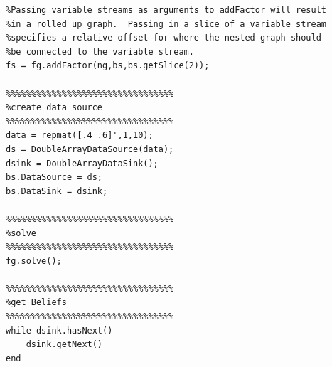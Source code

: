 \begin{lstlisting}
%Passing variable streams as arguments to addFactor will result 
%in a rolled up graph.  Passing in a slice of a variable stream 
%specifies a relative offset for where the nested graph should 
%be connected to the variable stream.                       
fs = fg.addFactor(ng,bs,bs.getSlice(2));

%%%%%%%%%%%%%%%%%%%%%%%%%%%%%%%%%                                                                                             
%create data source                                                                                                           
%%%%%%%%%%%%%%%%%%%%%%%%%%%%%%%%%  
data = repmat([.4 .6]',1,10);
ds = DoubleArrayDataSource(data);
dsink = DoubleArrayDataSink();
bs.DataSource = ds;
bs.DataSink = dsink;

%%%%%%%%%%%%%%%%%%%%%%%%%%%%%%%%%                                                                                             
%solve 
%%%%%%%%%%%%%%%%%%%%%%%%%%%%%%%%%                                                                                             
fg.solve();

%%%%%%%%%%%%%%%%%%%%%%%%%%%%%%%%%                                                                                             
%get Beliefs
%%%%%%%%%%%%%%%%%%%%%%%%%%%%%%%%%                                                                                             
while dsink.hasNext()
    dsink.getNext()
end

\end{lstlisting}

\fi

